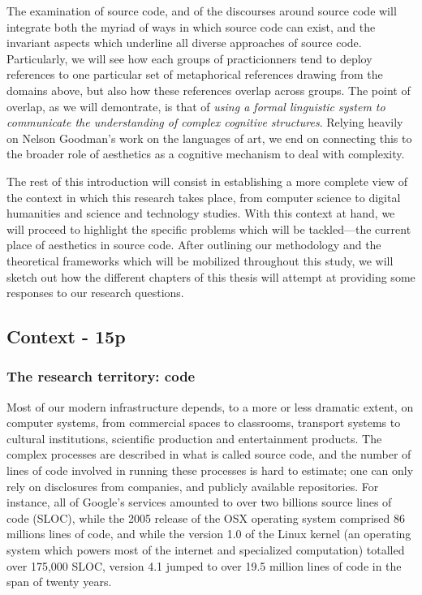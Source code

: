 The examination of source code, and of the discourses around source code will integrate both the myriad of ways in which source code can exist, and the invariant aspects which underline all diverse approaches of source code. Particularly, we will see how each groups of practicionners tend to deploy references to one particular set of metaphorical references drawing from the domains above, but also how these references overlap across groups. The point of overlap, as we will demontrate, is that of \emph{using a formal linguistic system to communicate the understanding of complex cognitive structures}. Relying heavily on Nelson Goodman's work on the languages of art\cite{goodman_languages_1976}, we end on connecting this to the broader role of aesthetics as a cognitive mechanism to deal with complexity.

The rest of this introduction will consist in establishing a more complete view of the context in which this research takes place, from computer science to digital humanities and science and technology studies. With this context at hand, we will proceed to highlight the specific problems which will be tackled—the current place of aesthetics in source code. After outlining our methodology and the theoretical frameworks which will be mobilized throughout this study, we will sketch out how the different chapters of this thesis will attempt at providing some responses to our research questions.

\subsection{Context - 15p}

\subsubsection{The research territory: code}

Most of our modern infrastructure depends, to a more or less dramatic extent, on computer systems\cite{kitchin_codespace_2011}, from commercial spaces to classrooms, transport systems to cultural institutions, scientific production and entertainment products. The complex processes are described in what is called source code, and the number of lines of code involved in running these processes is hard to estimate; one can only rely on disclosures from companies, and publicly available repositories. For instance, all of Google's services amounted to over two billions source lines of code (SLOC)\cite{scale_why_2015}, while the 2005 release of the OSX operating system comprised 86 millions lines of code, and while the version 1.0 of the Linux kernel (an operating system which powers most of the internet and specialized computation) totalled over 175,000 SLOC, version 4.1 jumped to over 19.5 million lines of code in the span of twenty years\cite{noauthor_linux_2021}.

